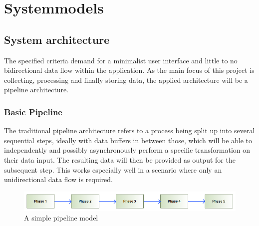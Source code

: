 \chapter{Systemmodels}
\label{ch:sysmodels}

\section{System architecture}
\label{sec:sysarchitecture}
The specified criteria demand for a minimalist user interface and little to no bidirectional data flow within the application. As the main focus of this project is collecting, processing and finally storing data, the applied architecture will be a pipeline architecture.

\subsection{Basic Pipeline}
\label{sec:sm_basicpipe}
The traditional pipeline architecture refers to a process being split up into several sequential steps, ideally with data buffers in between those, which will be able to independently and possibly asynchronously perform a specific transformation on their data input. The resulting data will then be provided as output for the subsequent step. This works especially well in a scenario where only an unidirectional data flow is required.
\begin{figure}[h!]
  \includegraphics[width=1.00\textwidth]{resources/simplepipeline.png}
  \centering
  \caption{A simple pipeline model}
  \label{fig:sm_basicpipe}
\end{figure}

